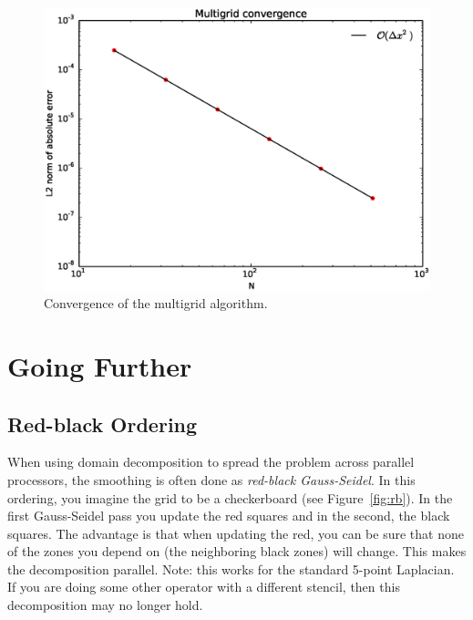 \begin{figure}[t]
\centering
\includegraphics[width=0.85\linewidth]{mg-converge}
\caption[Convergence of the multigrid
  algorithm]{\label{fig:mg:convergence} Convergence of the multigrid
  algorithm. \\ 
  }
\end{figure}


\section{Going Further}

\label{sec:multigrid:other}

\subsection{Red-black Ordering}

When using domain decomposition to spread the problem across parallel
processors, the smoothing is often done as {\em red-black
  Gauss-Seidel}.  In this ordering, you imagine the grid to be a
checkerboard (see Figure~\ref{fig:rb}).  In the first Gauss-Seidel
pass you update the red squares and in the second, the black squares.
The advantage is that when updating the red, you can be sure that none
of the zones you depend on (the neighboring black zones) will change.
This makes the decomposition parallel.  Note: this works for the
standard 5-point Laplacian.  If you are doing some other operator with
a different stencil, then this decomposition may no longer hold.

